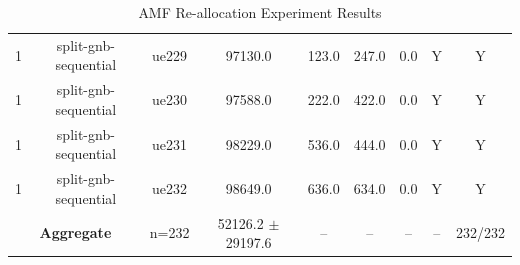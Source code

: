\begin{table}[ht]
\begin{tabular}{|c|c|c|c|c|c|c|c|c|}
1 & split-gnb-sequential & ue229 & 97130.0 & 123.0 & 247.0 & 0.0 & Y & Y \\
1 & split-gnb-sequential & ue230 & 97588.0 & 222.0 & 422.0 & 0.0 & Y & Y \\
1 & split-gnb-sequential & ue231 & 98229.0 & 536.0 & 444.0 & 0.0 & Y & Y \\
1 & split-gnb-sequential & ue232 & 98649.0 & 636.0 & 634.0 & 0.0 & Y & Y \\
\multicolumn{2}{|c|}{\textbf{Aggregate}} & n=232 & 52126.2 $\pm$ 29197.6 & -- & -- & -- & -- & 232/232 \\
\hline
\end{tabular}
\caption{AMF Re-allocation Experiment Results}
\label{tab:amf_realloc}
\end{table}
